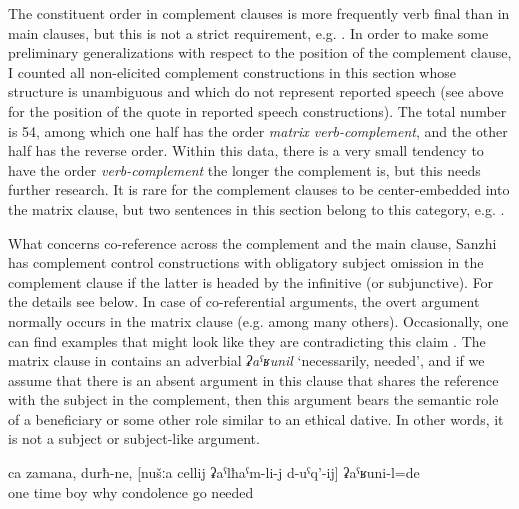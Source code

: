 The constituent order in complement clauses is more frequently verb final than in main clauses, but this is not a strict requirement, e.g. . In order to make some preliminary generalizations with respect to the position of the complement clause, I counted all non-elicited complement constructions in this section whose structure is unambiguous and which do not represent reported speech (see  above for the position of the quote in reported speech constructions). The total number is 54, among which one half has the order \textit{matrix verb-complement}, and the other half has the reverse order. Within this data, there is a very small tendency to have the order \textit{verb-complement} the longer the complement is, but this needs further research. It is rare for the complement clauses to be center-embedded into the matrix clause, but two sentences in this section belong to this category, e.g. .

What concerns co-reference across the complement and the main clause, Sanzhi has complement control constructions with obligatory subject omission in the complement clause if the latter is headed by the infinitive (or subjunctive). For the details see  below. In case of co-referential arguments, the overt argument normally occurs in the matrix clause (e.g.  among many others). Occasionally, one can find examples that might look like they are contradicting this claim . The matrix clause in  contains an adverbial \textit{ʡaˁʁunil} `necessarily, needed', and if we assume that there is an absent argument in this clause that shares the reference with the subject in the complement, then this argument bears the semantic role of a beneficiary or some other role similar to an ethical dative. In other words, it is not a subject or subject-like argument.
%
\begin{exe}
	\ex	\label{ex:‎‎‎One time, guys, we had for some reason to go to say condolences}
	\gll	ca	zamana,	durħ-ne,	[nušːa	cellij	ʡaˁlħaˁm-li-j	d-uˁq'-ij]	ʡaˁʁuni-l=de\\
		one	time		boy		why	condolence	go	needed\\
	\glt	{}
\end{exe}

